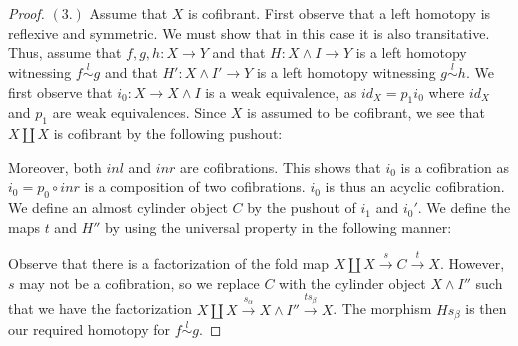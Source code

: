 \documentclass[../thesis.tex]{subfiles}
\begin{document}
\begin{proof}
                $(3.)$ Assume that $X$ is cofibrant. First observe that a left homotopy is reflexive and symmetric. We must show that in this case it is also transitative. Thus, assume that $f,g,h:X\rightarrow Y$ and that $H:X\wedge I\rightarrow Y$ is a left homotopy witnessing $f \overset{l}{\sim} g$ and that $H':X\wedge I'\rightarrow Y$ is a left homotopy witnessing $g\overset{l}{\sim} h$. We first observe that $i_0: X\rightarrow X\wedge I$ is a weak equivalence, as $id_X = p_1i_0$ where $id_X$ and $p_1$ are weak equivalences. Since $X$ is assumed to be cofibrant, we see that $X\coprod X$ is cofibrant by the following pushout:
                \begin{center}
                \end{center}
                Moreover, both $inl$ and $inr$ are cofibrations. This shows that $i_0$ is a cofibration as $i_0 = p_0\circ inr$ is a composition of two cofibrations. $i_0$ is thus an acyclic cofibration. We define an almost cylinder object $C$ by the pushout of $i_1$ and $i_0'$. We define the maps $t$ and $H''$ by using the universal property in the following manner:
                \begin{center}
                    \qquad
                \end{center}
                Observe that there is a factorization of the fold map $X\coprod X \overset{s}{\rightarrow} C \overset{t}{\rightarrow} X$. However, $s$ may not be a cofibration, so we replace $C$ with the cylinder object $X\wedge I''$ such that we have the factorization $X\coprod X \overset{s_\alpha}{\rightarrow} X\wedge I'' \overset{ts_\beta}{\rightarrow} X$. The morphism $Hs_\beta$ is then our required homotopy for $f\overset{l}{\sim}g$.


\end{proof}
\end{document}

